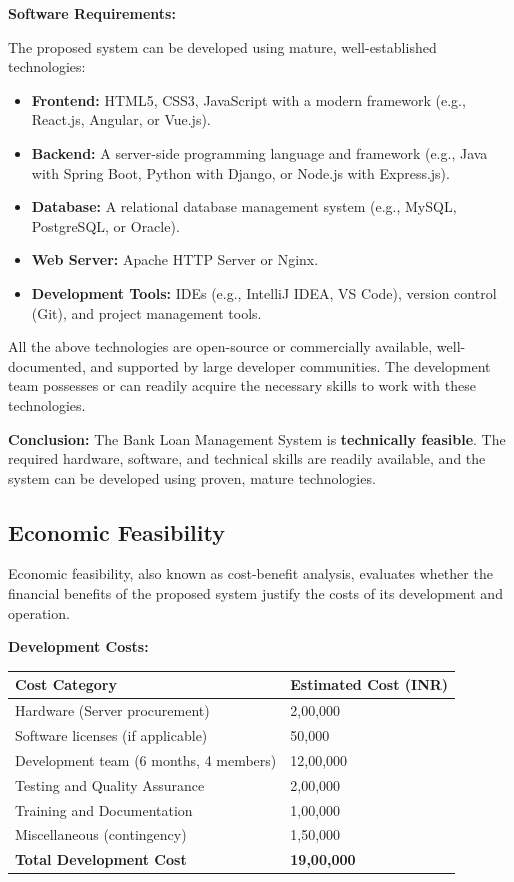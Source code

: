 \documentclass[12pt,a4paper,oneside]{report}
\begin{document}
\textbf{Software Requirements:}

The proposed system can be developed using mature, well-established technologies:

\begin{itemize}
  \item \textbf{Frontend:} HTML5, CSS3, JavaScript with a modern framework (e.g., React.js, Angular, or Vue.js).
  \item \textbf{Backend:} A server-side programming language and framework (e.g., Java with Spring Boot, Python with Django, or Node.js with Express.js).
  \item \textbf{Database:} A relational database management system (e.g., MySQL, PostgreSQL, or Oracle).
  \item \textbf{Web Server:} Apache HTTP Server or Nginx.
  \item \textbf{Development Tools:} IDEs (e.g., IntelliJ IDEA, VS Code), version control (Git), and project management tools.
\end{itemize}

All the above technologies are open-source or commercially available, well-documented, and supported by large developer communities. The development team possesses or can readily acquire the necessary skills to work with these technologies.

\textbf{Conclusion:} The Bank Loan Management System is \textbf{technically feasible}. The required hardware, software, and technical skills are readily available, and the system can be developed using proven, mature technologies.

\subsection{Economic Feasibility}

Economic feasibility, also known as cost-benefit analysis, evaluates whether the financial benefits of the proposed system justify the costs of its development and operation.

\textbf{Development Costs:}

\begin{table}[htbp]
\centering
\small
\begin{tabularx}{\textwidth}{l l}
\toprule
\textbf{Cost Category} & \textbf{Estimated Cost (INR)} \\
\midrule
Hardware (Server procurement) & 2,00,000 \\
Software licenses (if applicable) & 50,000 \\
Development team (6 months, 4 members) & 12,00,000 \\
Testing and Quality Assurance & 2,00,000 \\
Training and Documentation & 1,00,000 \\
Miscellaneous (contingency) & 1,50,000 \\
\textbf{Total Development Cost} & \textbf{19,00,000} \\
\bottomrule
\end{tabularx}
\end{table}
\end{document}
